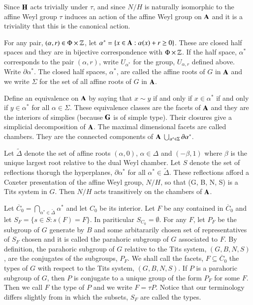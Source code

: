 Since $\mathbf{H}$ acts trivially under $\tau$, and since $N/H$ is naturally isomorphic to the affine Weyl group $\tau$ induces an action of the affine Weyl group on $\mathbf{A}$ and it is a triviality that this is the canonical action. 

For any pair, $(\alpha, r) \in \Phi \times \mathbb{Z}$, let $\alpha^{*} = \{x \in \mathbf{A} : \alpha(x) + r \geq 0\}$. These are closed half spaces and they are in bijective correspondence with $\Phi \times \mathbb{Z}$. If the half space, $\alpha^{*}$ corresponds to the pair $(\alpha, r)$, write $U_{\alpha^{*}}$ for the group, $U_{\alpha, r}$ defined above. Write $\partial\alpha^{*}$. The closed half spaces, $\alpha^{*}$, are called the affine roots of $G$ in $\mathbf{A}$ and we write $\Sigma$ for the set of all affine roots of $G$ in $\mathbf{A}$.

Define an equivalence on $\mathbf{A}$ by saying that $x\sim y$ if and only if $x \in \alpha^{*}$ if and only if $y \in \alpha^{*}$ for all $\alpha \in \Sigma$. These equivalence classes are the facets of $\mathbf{A}$ and they are the interiors of simplies (because $\mathbf{G}$ is of simple type). Their closures give a simplicial decomposition of $\mathbf{A}$. The maximal dimensional facets are called chambers. They are the connected components of $\mathbf{A}\ \bigcup_{\alpha^{*} \in \Sigma}\partial \alpha^{*}$.

Let $\tilde{\Delta}$ denote the set of affine roots $(\alpha, 0)$, $\alpha \in \Delta$ and $(-\beta, 1)$ where $\beta$ is the unique largest root relative to the dual Weyl chamber. Let $S$ denote the set of reflections thorugh the hyperplanes, $\partial\alpha^{*}$ for all $\alpha^{*} \in \tilde{\Delta}$. These reflections afford a Coxeter presentation of the affine Weyl group, $N/H$, so that (G, B, N, S) is a Tits system in $G$. Then $N/H$ acts transitively on the chambers of $\mathbf{A}$.

Let $\overline{C}_{0} = \bigcap_{\alpha^{*} \in \tilde{\Delta}} \alpha^{*}$ and let $C_{0}$ be its interior. Let $F$ be any contained in $\overline{C}_{0}$ and let $S_{F} = \{ s \in S : s(F) = F \}$. In pariticular $S_{C_{0}} = \emptyset$. For any $F$, let $P_{F}$ be the subgroup of $G$ generate by $B$ and some arbitararily chosen set of representatives of $S_{F}$ chosen and it is called the parahoric subgroup of $G$ associated to $F$. By definition, the parahoric subgroup of $G$ relative to the Tits system, $(G, B, N, S)$, are the conjugates of the subgroups, $P_{F}$. We shall call the facets, $F \subseteq \overline{C}_{0}$ the types of $G$ with respect to the Tits system, $(G, B, N, S)$. If $P$ is a parahoric subgroup of $G$, then $P$ is conjugate to a unique group of the form $P_{F}$ for some $F$. Then we call $F$ the type of $P$ and we write $F= \tau{P}$. Notice that our terminology differs slightly from \cite{art6-keyBT I} in which the subsets, $S_{F}$ are called the types. 

